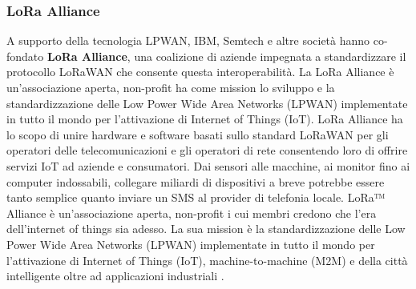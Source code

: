 \documentclass[a4paper]{report} %
\begin{document}
\subsubsection{LoRa Alliance}
A supporto della tecnologia LPWAN, IBM, Semtech e altre società hanno co-fondato \textbf{LoRa Alliance}, una coalizione di aziende impegnata a standardizzare il protocollo LoRaWAN che consente questa interoperabilità. La LoRa Alliance è un’associazione aperta, non-profit ha come mission lo sviluppo e la standardizzazione delle Low Power Wide Area Networks (LPWAN) implementate in tutto il mondo per l’attivazione di Internet of Things (IoT).  LoRa Alliance ha lo scopo di unire hardware e software basati sullo standard LoRaWAN per gli operatori delle telecomunicazioni e gli operatori di rete consentendo loro di offrire servizi IoT ad aziende e consumatori. Dai sensori alle macchine, ai monitor fino ai computer indossabili, collegare miliardi di dispositivi a breve potrebbe essere tanto semplice quanto inviare un SMS al provider di telefonia locale.
LoRa™ Alliance è un'associazione aperta, non-profit i cui membri credono che l'era dell'internet of things sia adesso. La sua mission è la standardizzazione delle Low Power Wide Area Networks (LPWAN) implementate in tutto il mondo per l'attivazione di Internet of Things (IoT), machine-to-machine (M2M) e della città intelligente oltre ad applicazioni industriali \cite{art:rif.26}.
\end{document}
